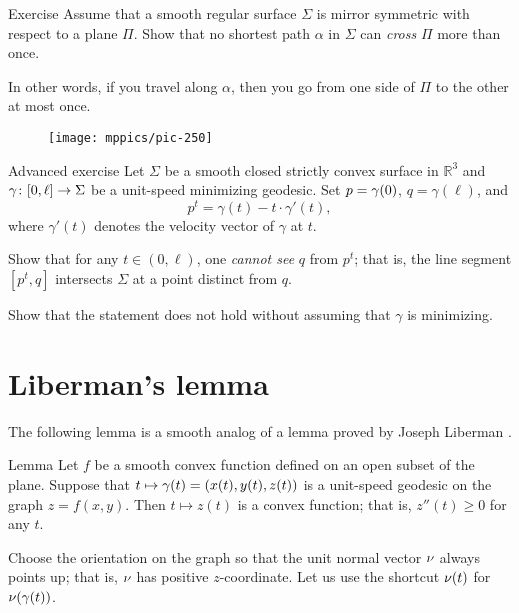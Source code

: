 \begin{thm}{Exercise}\label{ex:min-geod+plane}
Assume that a smooth regular surface $\Sigma$ is mirror symmetric with respect to a plane $\Pi$.
Show that no shortest path $\alpha$ in $\Sigma$ can {}\emph{cross} $\Pi$ more than once.


In other words, if you travel along $\alpha$, then you go from one side of $\Pi$ to the other at most once. 
\end{thm}

{

\begin{wrapfigure}{r}{40 mm}
\vskip-8mm
\centering
\texttt{[image: mppics/pic-250]}
\vskip-0mm
\end{wrapfigure}

\begin{thm}{Advanced exercise}\label{ex:milka}
Let $\Sigma$ be a smooth closed strictly convex surface 
in $\mathbb{R}^3$ 
and $\gamma\:[0,\ell]\z\to \Sigma$ be a unit-speed minimizing geodesic.
Set $p\z=\gamma(0)$, $q=\gamma(\ell)$, and 
$$p^t=\gamma(t)-t\cdot\gamma'(t),$$ 
where $\gamma'(t)$ denotes the velocity vector of $\gamma$ at $t$.

Show that for any $t\in (0,\ell)$,
one {}\emph{cannot see} $q$ from $p^t$;
that is, the line segment $[p^t,q]$ intersects $\Sigma$ at a point distinct from $q$.

Show that the statement does not hold without assuming that $\gamma$ is minimizing.
\end{thm}

}

\section{Liberman's lemma}

The following lemma is a smooth analog of a lemma proved by Joseph Liberman \cite{liberman}.

\begin{thm}{Lemma}
\label{lem:liberman}
Let $f$ be a smooth convex function defined on an open subset of the plane.
Suppose that $t\mapsto \gamma(t)\z=(x(t),y(t),z(t))$ is a unit-speed geodesic on the graph $z=f(x,y)$.
Then $t\mapsto z(t)$ is a convex function; that is, $z''(t)\ge 0$ for any $t$.
\end{thm}

Choose the orientation on the graph so that the unit normal vector $\nu$ always points up;
that is, $\nu$ has positive $z$-coordinate.
Let us use the shortcut $\nu(t)$ for $\nu(\gamma(t))$.

